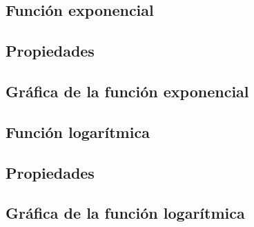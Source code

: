 \subsection{Función exponencial}

\subsection{Propiedades}

\subsection{Gráfica de la función exponencial}

\subsection{Función logarítmica}

\subsection{Propiedades}

\subsection{Gráfica de la función logarítmica}